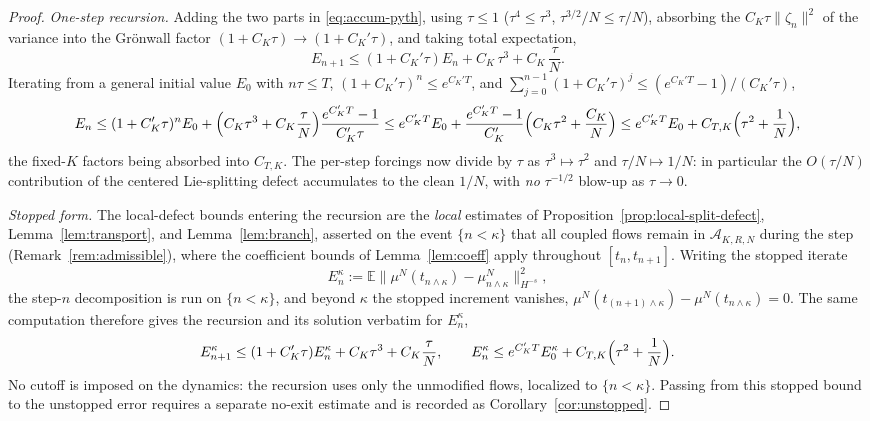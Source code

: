\documentclass[a4paper,fleqn]{cas-sc}
\theoremstyle{definition}
\theoremstyle{remark}
\begin{document}
\begin{proof}
\emph{One-step recursion.} Adding the two parts in \eqref{eq:accum-pyth}, using
$\tau\le1$ ($\tau^4\le\tau^3$, $\tau^{3/2}/N\le\tau/N$), absorbing the
$C_K\tau\|\zeta_n\|^2$ of the variance into the Gr\"onwall factor
$(1+C_K\tau)\to(1+C_K'\tau)$, and taking total expectation,
\[
E_{n+1}\le(1+C_K'\tau)E_n+C_K\,\tau^3+C_K\,\frac{\tau}{N}.
\]
Iterating from a general initial value $E_0$ with $n\tau\le T$,
$(1+C_K'\tau)^n\le e^{C_K'T}$, and $\sum_{j=0}^{n-1}(1+C_K'\tau)^j
\le(e^{C_K'T}-1)/(C_K'\tau)$,
\[
E_n
\le(1+C_K'\tau)^nE_0+\Bigl(C_K\tau^3+C_K\frac{\tau}{N}\Bigr)\frac{e^{C_K'T}-1}{C_K'\tau}
\le e^{C_K'T}E_0+\frac{e^{C_K'T}-1}{C_K'}\Bigl(C_K\tau^2+\frac{C_K}{N}\Bigr)
\le e^{C_K'T}E_0+C_{T,K}\Bigl(\tau^2+\frac{1}{N}\Bigr),
\]
the fixed-$K$ factors being absorbed into $C_{T,K}$. The per-step forcings now divide
by $\tau$ as $\tau^3\mapsto\tau^2$ and $\tau/N\mapsto1/N$: in particular the
$O(\tau/N)$ contribution of the centered Lie-splitting defect accumulates to the
clean $1/N$, with \emph{no} $\tau^{-1/2}$ blow-up as $\tau\to0$.

\emph{Stopped form.} The local-defect bounds entering the recursion are the
\emph{local} estimates of Proposition~\ref{prop:local-split-defect},
Lemma~\ref{lem:transport}, and Lemma~\ref{lem:branch}, asserted on the event $\{n<\kappa\}$ that all
coupled flows remain in $\mathcal A_{K,R,N}$ during the step (Remark~\ref{rem:admissible}), where the
coefficient bounds of Lemma~\ref{lem:coeff} apply throughout $[t_n,t_{n+1}]$. Writing the stopped iterate
\[
E_n^\kappa:=\mathbb E\bigl\|\mu^N(t_{n\wedge\kappa})-\mu^N_{n\wedge\kappa}\bigr\|_{H^{-s}}^2,
\]
the step-$n$ decomposition is run on $\{n<\kappa\}$, and beyond $\kappa$ the stopped increment vanishes,
$\mu^N(t_{(n+1)\wedge\kappa})-\mu^N(t_{n\wedge\kappa})=0$. The same computation therefore gives the
recursion and its solution verbatim for $E_n^\kappa$,
\[
E_{n+1}^\kappa\le(1+C_K'\tau)E_n^\kappa+C_K\tau^3+C_K\frac{\tau}{N},
\qquad
E_n^\kappa\le e^{C_K'T}E_0^\kappa+C_{T,K}\Bigl(\tau^2+\frac{1}{N}\Bigr).
\]
No cutoff is imposed on the dynamics: the recursion uses only the unmodified flows, localized to
$\{n<\kappa\}$. Passing from this stopped bound to the unstopped error requires a separate no-exit
estimate and is recorded as Corollary~\ref{cor:unstopped}.
\end{proof}
\end{document}
